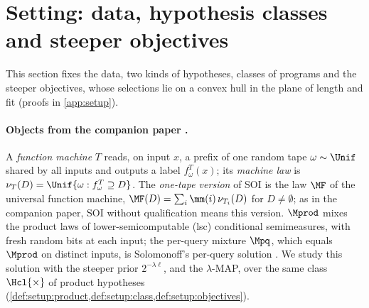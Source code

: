 \section{Setting: data, hypothesis classes and steeper objectives}\label{sec:setup}

This section fixes the data, two kinds of hypotheses, classes of programs and the steeper objectives, whose selections lie on a convex hull in the plane of length and fit (proofs in \cref{app:setup}).

\paragraph{Objects from the companion paper \citep{claudeSFI2026fundamentals}.}
A \emph{function machine} $T$ reads, on input $x$, a prefix of one random tape $\omega\sim\Unif$ shared by all inputs and outputs a label $f^T_\omega(x)$; its \emph{machine law} is $\nu_T(D)=\Unif\{\omega:f^T_\omega\supseteq D\}$. The \emph{one-tape version} of SOI is the law $\MF$ of the universal function machine, $\MF(D)=\sum_i\mm(i)\,\nu_{T_i}(D)$ for $D\ne\emptyset$; as in the companion paper, SOI without qualification means this version. $\Mprod$ mixes the product laws of lower-semicomputable (lsc) conditional semimeasures, with fresh random bits at each input; the per-query mixture $\Mpq$, which equals $\Mprod$ on distinct inputs, is Solomonoff's per-query solution \citep[eq.~(10)]{solomonoff2008three}. We study this solution with the steeper prior $2^{-\lambda\ell}$, and the $\lambda$-MAP, over the same class $\Hcl{\times}$ of product hypotheses (\cref{def:setup:product,def:setup:class,def:setup:objectives}).

